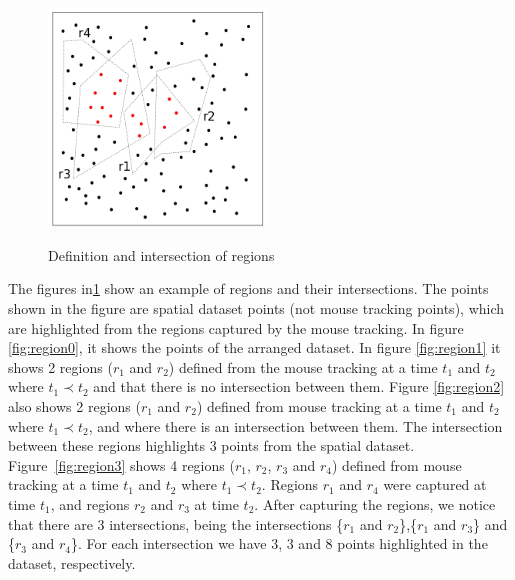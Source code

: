 \documentclass[runningheads,a4paper]{llncs}
\begin{document}
\begin{figure}[!ht]
{    \includegraphics[width=5.8cm]{imgs/region3.png}
     \label{fig:region3} 
  } %
 

  \caption{Definition and intersection of regions}
  \label{fig:regions}
\end{figure} %

The figures in\ref{fig:regions} show an example of regions and their intersections. The points shown in the figure are spatial dataset points (not mouse tracking points), which are highlighted from the regions captured by the mouse tracking. In figure \ref{fig:region0}, it shows the points of the arranged dataset. In figure \ref{fig:region1} it shows 2 regions ($r_1$ and $r_2$) defined from the mouse tracking at a time $t_1$ and $t_2$ where $t_1 \prec t_2$ and that there is no intersection between them. Figure \ref{fig:region2} also shows 2 regions ($r_1$ and $r_2$) defined from mouse tracking at a time $t_1$ and $t_2$ where $t_1 \prec t_2$, and where there is an intersection between them. The intersection between these regions highlights 3 points from the spatial dataset. Figure~\ref{fig:region3} shows 4 regions ($r_1$, $r_2$, $r_3$ and $r_4$) defined from mouse tracking at a time $t_1$ and $t_2$ where $t_1 \prec t_2 $. Regions $r_1$ and $r_4$ were captured at time $t_1$, and regions $r_2$ and $r_3$ at time $t_2$. After capturing the regions, we notice that there are 3 intersections, being the intersections \{$r_1$ and $r_2$\},\{$r_1$ and $r_3$\} and \{$r_3$ and $r_4$\}. For each intersection we have 3, 3 and 8 points highlighted in the dataset, respectively.

\end{document}
